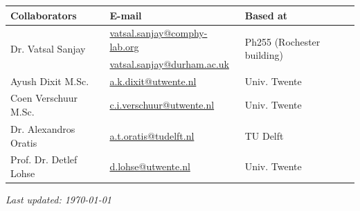 \documentclass[11pt]{article}
\begin{document}
\begin{center}
\begin{tabular}{|l|l|l|}
\hline \textbf{Collaborators} & \textbf{E-mail} & \textbf{Based at} \\
\hline \multirow{2}{*}{Dr. Vatsal Sanjay} & \href{mailto:vatsal.sanjay@comphy-lab.org}{vatsal.sanjay@comphy-lab.org} & \multirow{2}{*}{Ph255 (Rochester building)} \\
& \href{mailto:vatsal.sanjay@durham.ac.uk}{vatsal.sanjay@durham.ac.uk} & \\
\hline Ayush Dixit M.Sc. & \href{mailto:a.k.dixit@utwente.nl}{a.k.dixit@utwente.nl} & Univ. Twente \\
\hline Coen Verschuur M.Sc. & \href{mailto:c.i.verschuur@utwente.nl}{c.i.verschuur@utwente.nl} & Univ. Twente \\
\hline Dr. Alexandros Oratis   & \href{mailto:a.t.oratis@tudelft.nl}{a.t.oratis@tudelft.nl}& TU Delft \\
\hline Prof. Dr. Detlef Lohse & \href{mailto:d.lohse@utwente.nl}{d.lohse@utwente.nl} & Univ. Twente  \\
\hline
\end{tabular}
\end{center}

\vspace{1em}
\noindent\textit{Last updated: \today}

\printbibliography
\end{document}
